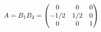 \documentclass[preview]{standalone}
\begin{document}
\begin{align*}
\special{dvisvgm:raw <g id='unique000'>}A=B_1B_2=\begin{pmatrix}0&0&0\\-1/2&1/2&0\\0&0&1\end{pmatrix}\special{dvisvgm:raw </g>}
\end{align*}
\end{document}
